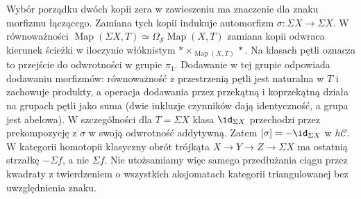 Wybór porządku dwóch kopii zera w zawieszeniu ma znaczenie dla znaku morfizmu łączącego. Zamiana tych kopii indukuje automorfizm $\sigma:\Sigma X\to\Sigma X$. W równoważności $\operatorname{Map}(\Sigma X,T)\simeq\Omega_{\mathcal S}\operatorname{Map}(X,T)$ zamiana kopii odwraca kierunek ścieżki w iloczynie włóknistym $*\times_{\operatorname{Map}(X,T)}*$. Na klasach pętli oznacza to przejście do odwrotności w grupie $\pi_1$. Dodawanie w tej grupie odpowiada dodawaniu morfizmów: równoważność z przestrzenią pętli jest naturalna w $T$ i zachowuje produkty, a operacja dodawania przez przekątną i koprzekątną działa na grupach pętli jako suma (dwie inkluzje czynników dają identyczność, a grupa jest abelowa). W szczególności dla $T=\Sigma X$ klasa $\id_{\Sigma X}$ przechodzi przez prekompozycję z $\sigma$ w swoją odwrotność addytywną. Zatem $[\sigma]=-\id_{\Sigma X}$ w $h\mathcal C$. W kategorii homotopii klasyczny obrót trójkąta $X\to Y\to Z\to\Sigma X$ ma ostatnią strzałkę $-\Sigma f$, a nie $\Sigma f$. Nie utożsamiamy więc samego przedłużania ciągu przez kwadraty z twierdzeniem o wszystkich aksjomatach kategorii triangulowanej bez uwzględnienia znaku.

